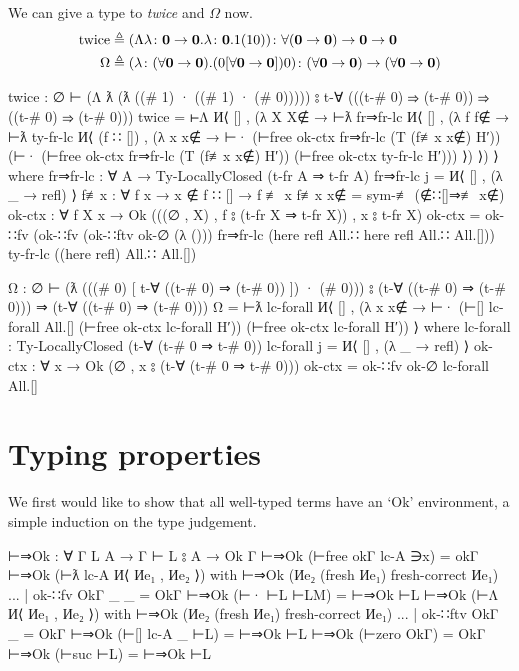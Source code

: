 \documentclass[logo,bsc,singlespacing,parskip,online]{infthesis}
\begin{document}
We can give a type to \textit{twice} and $\Omega$ now.
\begin{align}
\label{equation:twice_big_omega}
  \text{twice} &\triangleq (\Lambda \lambda \colon \mathbf{0} \to \mathbf{0}. \lambda \colon \mathbf{0}. 1(10))
    \colon \forall (\mathbf{0} \to \mathbf{0}) \to \mathbf{0} \to \mathbf{0}\\
  \Omega &\triangleq (\lambda \colon (\forall \mathbf{0} \to \mathbf{0}). (0 [\forall \mathbf{0} \to \mathbf{0}]) 0)
    \colon (\forall \mathbf{0} \to \mathbf{0}) \to (\forall \mathbf{0} \to \mathbf{0}) \notag
\end{align}
\begin{code}
  twice : ∅ ⊢ (Λ ƛ (ƛ ((# 1) · ((# 1) · (# 0)))))
      ⦂ t-∀ (((t-# 0) ⇒ (t-# 0)) ⇒ ((t-# 0) ⇒ (t-# 0)))
  twice = ⊢Λ И⟨ [] , (λ X {X∉} → ⊢ƛ fr⇒fr-lc И⟨ [] , (λ f {f∉} →
    ⊢ƛ ty-fr-lc И⟨ (f ∷ []) , (λ x {x∉} → ⊢·
      (⊢free ok-ctx fr⇒fr-lc (T (f≢x x∉) H′))
      (⊢·
        (⊢free ok-ctx fr⇒fr-lc (T (f≢x x∉) H′))
        (⊢free ok-ctx ty-fr-lc H′))) ⟩) ⟩) ⟩
    where
      fr⇒fr-lc : ∀ {A} → Ty-LocallyClosed (t-fr A ⇒ t-fr A)
      fr⇒fr-lc j = И⟨ [] , (λ _ → refl) ⟩
      f≢x : ∀ {f x} → x ∉ f ∷ [] → f ≢ x
      f≢x x∉ = sym-≢ (∉∷[]⇒≢ x∉)
      ok-ctx : ∀ {f X x}
        → Ok (((∅ , X) , f ⦂ (t-fr X ⇒ t-fr X)) , x ⦂ t-fr X)
      ok-ctx = ok-∷fv
                  (ok-∷fv (ok-∷ftv ok-∅ (λ ()))
                    fr⇒fr-lc
                    (here refl All.∷ here refl All.∷ All.[]))
                  ty-fr-lc
                  ((here refl) All.∷ All.[])

  Ω : ∅ ⊢ (ƛ (((# 0) [ t-∀ ((t-# 0) ⇒ (t-# 0)) ]) · (# 0)))
      ⦂ (t-∀ ((t-# 0) ⇒ (t-# 0))) ⇒ (t-∀ ((t-# 0) ⇒ (t-# 0)))
  Ω = ⊢ƛ lc-forall И⟨ [] , (λ x {x∉} →
    ⊢·
      (⊢[] lc-forall All.[] (⊢free ok-ctx lc-forall H′))
      (⊢free ok-ctx lc-forall H′)) ⟩
    where
      lc-forall : Ty-LocallyClosed (t-∀ (t-# 0 ⇒ t-# 0))
      lc-forall j = И⟨ [] , (λ _ → refl) ⟩
      ok-ctx : ∀ {x} →  Ok (∅ , x ⦂ (t-∀ (t-# 0 ⇒ t-# 0)))
      ok-ctx = ok-∷fv ok-∅ lc-forall All.[]
\end{code}

\section{Typing properties}
We first would like to show that all well-typed terms have an `Ok' environment, a simple induction
on the type judgement.
\begin{code}
  ⊢⇒Ok : ∀ {Γ L A} → Γ ⊢ L ⦂ A → Ok Γ
  ⊢⇒Ok (⊢free okΓ lc-A ∋x) = okΓ
  ⊢⇒Ok (⊢ƛ lc-A И⟨ Иe₁ , Иe₂ ⟩)
    with ⊢⇒Ok (Иe₂ (fresh Иe₁) {fresh-correct Иe₁})
  ... | ok-∷fv OkΓ _ _ = OkΓ
  ⊢⇒Ok (⊢· ⊢L ⊢LM) = ⊢⇒Ok ⊢L
  ⊢⇒Ok (⊢Λ И⟨ Иe₁ , Иe₂ ⟩)
    with ⊢⇒Ok (Иe₂ (fresh Иe₁) {fresh-correct Иe₁})
  ... | ok-∷ftv OkΓ _ = OkΓ
  ⊢⇒Ok (⊢[] lc-A _ ⊢L) = ⊢⇒Ok ⊢L
  ⊢⇒Ok (⊢zero OkΓ) = OkΓ
  ⊢⇒Ok (⊢suc ⊢L) = ⊢⇒Ok ⊢L
\end{code}
\end{document}
